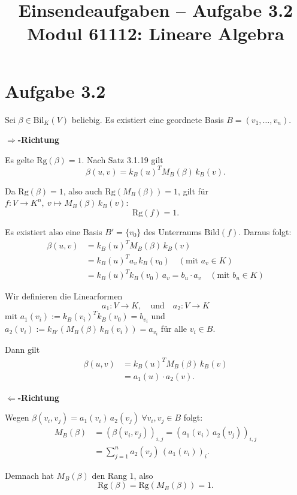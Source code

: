\documentclass[a4paper,12pt]{article}
\title{Einsendeaufgaben -- Aufgabe 3.2\\[0.5em]
\large Modul 61112: Lineare Algebra}
\author{}
\date{}
\begin{document}
\maketitle

\section*{Aufgabe 3.2}

Sei $\beta \in \mathrm{Bil}_K(V)$ beliebig. Es existiert eine geordnete Basis $B = (v_1, \ldots, v_n)$.

\bigskip
\textbf{\glqq$\Rightarrow$\grqq-Richtung}

Es gelte $\mathrm{Rg}(\beta) = 1$.
Nach Satz 3.1.19 gilt
\[
  \beta(u,v) = k_B(u)^T M_B(\beta)\, k_B(v).
\]

Da $\mathrm{Rg}(\beta) = 1$, also auch $\mathrm{Rg}(M_B(\beta)) = 1$, gilt für $f: V \to K^n,\ v \mapsto M_B(\beta)\, k_B(v)$:
\[
  \mathrm{Rg}(f) = 1.
\]

Es existiert also eine Basis $B' = \{v_0\}$ des Unterraums $\mathrm{Bild}(f)$.
Daraus folgt:
\begin{align*}
  \beta(u,v) &= k_B(u)^T M_B(\beta)\, k_B(v) \\
             &= k_B(u)^T a_v\, k_B(v_0) \quad (\text{mit } a_v \in K) \\
             &= k_B(u)^T k_B(v_0)\, a_v = b_u \cdot a_v \quad (\text{mit } b_u \in K)
\end{align*}

Wir definieren die Linearformen
\[
  a_1: V \to K, \quad \text{und} \quad a_2: V \to K
\]
mit $a_1(v_i) := k_B(v_i)^T k_B(v_0) = b_{v_i}$
und $a_2(v_i) := k_{B'}(M_B(\beta)\, k_B(v_i)) = a_{v_i}$
für alle $v_i \in B$.

Dann gilt
\begin{align*}
  \beta(u,v) &= k_B(u)^T M_B(\beta)\, k_B(v) \\
             &= a_1(u) \cdot a_2(v).
\end{align*}

\bigskip
\textbf{\glqq$\Leftarrow$\grqq-Richtung}

Wegen $\beta(v_i, v_j) = a_1(v_i)\, a_2(v_j)\ \forall v_i, v_j \in B$ folgt:
\begin{align*}
  M_B(\beta) &= (\beta(v_i, v_j))_{i,j} = (a_1(v_i)\, a_2(v_j))_{i,j} \\
             &= \sum_{j=1}^{n} a_2(v_j)\, (a_1(v_i))_i.
\end{align*}

Demnach hat $M_B(\beta)$ den Rang $1$, also
\[
  \mathrm{Rg}(\beta) = \mathrm{Rg}(M_B(\beta)) = 1.
\]
\end{document}
